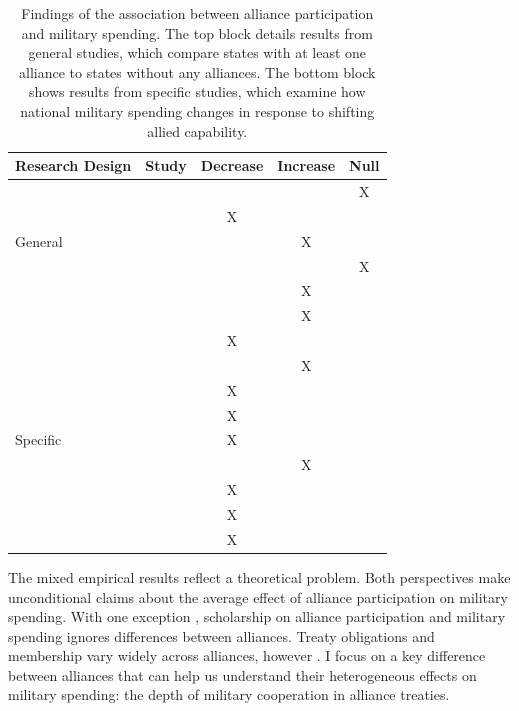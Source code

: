 \documentclass[12pt]{article}
\begin{document}
\begin{table}[hbt!]
\begin{center}
\begin{tabular}{lcccc}
   Research Design  & Study & Decrease & Increase & Null \\
\hline
\multirow{5}{*}{General} & \citet{MostSiverson1987} &  &  & X \\
 & \citet{Conybeare1994}    & X & &  \\
 & \citet{Diehl1994}        &  & X &  \\
 & \citet{Goldsmith2003}    &  &  & X \\
 & \citet{MorganPalmer2006} &  & X & \\ 
 & \citet{QuirozFlores2011} &  & X &  \\ 
 & \citet{OnealWhatley1996} & X &  & \\ 
 \hline
 \multirow{7}{*}{Specific} &\citet{ConybeareSandler1990} &   & X &  \\
 &\citet{BarnettLevy1991} & X  &  &  \\
 &\citet{Morrow1993}      & X  &  &  \\
 &\citet{Sorokin1994}     & X  &  &  \\
 &\citet{Chenetal1996}    &  & X &  \\
 &\citet{PluemperNeumayer2015} & X &  &  \\
 &\citet{GeorgeSandler2017} & X &  &  \\
 &\citet{OlsonZeckhauser1966} & X & & \\
\hline
\end{tabular}
\caption{Findings of the association between alliance participation and military spending. The top block details results from general studies, which compare states with at least one alliance to states without any alliances. The bottom block shows results from specific studies, which examine how national military spending changes in response to shifting allied capability.}
\label{tab:results-sum}
\end{center} 
\end{table}


The mixed empirical results reflect a theoretical problem. 
Both perspectives make unconditional claims about the average effect of alliance participation on military spending.  
With one exception \citep{DigiuseppePoast2016}, scholarship on alliance participation and military spending ignores differences between alliances.
Treaty obligations and membership vary widely across alliances, however \citep{Leedsetal2002}. 
I focus on a key difference between alliances that can help us understand their heterogeneous effects on military spending: the depth of military cooperation in alliance treaties.
\end{document}

